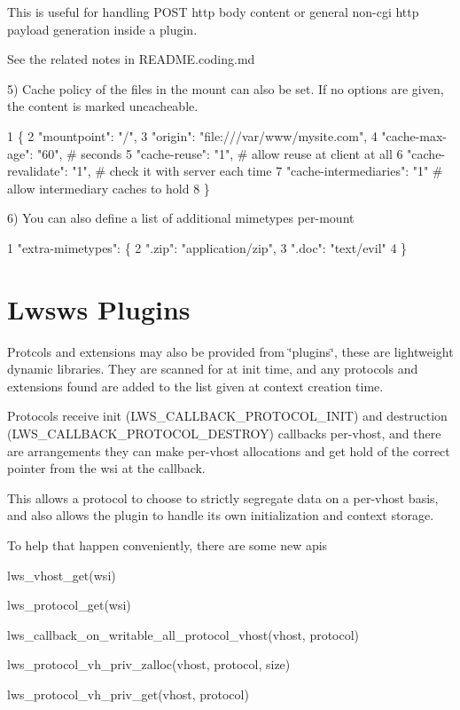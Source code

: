 This is useful for handling P\+O\+ST http body content or general non-\/cgi http payload generation inside a plugin.

See the related notes in R\+E\+A\+D\+M\+E.\+coding.\+md

5) Cache policy of the files in the mount can also be set. If no options are given, the content is marked uncacheable. 
\begin{DoxyCode}
1 \{
2  "mountpoint": "/",
3  "origin": "file:///var/www/mysite.com",
4  "cache-max-age": "60",      # seconds
5  "cache-reuse": "1",         # allow reuse at client at all
6  "cache-revalidate": "1",    # check it with server each time
7  "cache-intermediaries": "1" # allow intermediary caches to hold
8 \}
\end{DoxyCode}


6) You can also define a list of additional mimetypes per-\/mount 
\begin{DoxyCode}
1 "extra-mimetypes": \{
2          ".zip": "application/zip",
3          ".doc": "text/evil"
4  \}
\end{DoxyCode}
\hypertarget{md_README.lwsws_lwswspl}{}\section{Lwsws Plugins}\label{md_README.lwsws_lwswspl}
Protcols and extensions may also be provided from \char`\"{}plugins\char`\"{}, these are lightweight dynamic libraries. They are scanned for at init time, and any protocols and extensions found are added to the list given at context creation time.

Protocols receive init (L\+W\+S\+\_\+\+C\+A\+L\+L\+B\+A\+C\+K\+\_\+\+P\+R\+O\+T\+O\+C\+O\+L\+\_\+\+I\+N\+IT) and destruction (L\+W\+S\+\_\+\+C\+A\+L\+L\+B\+A\+C\+K\+\_\+\+P\+R\+O\+T\+O\+C\+O\+L\+\_\+\+D\+E\+S\+T\+R\+OY) callbacks per-\/vhost, and there are arrangements they can make per-\/vhost allocations and get hold of the correct pointer from the wsi at the callback.

This allows a protocol to choose to strictly segregate data on a per-\/vhost basis, and also allows the plugin to handle its own initialization and context storage.

To help that happen conveniently, there are some new apis


\begin{DoxyItemize}
\item lws\+\_\+vhost\+\_\+get(wsi)
\item lws\+\_\+protocol\+\_\+get(wsi)
\item lws\+\_\+callback\+\_\+on\+\_\+writable\+\_\+all\+\_\+protocol\+\_\+vhost(vhost, protocol)
\item lws\+\_\+protocol\+\_\+vh\+\_\+priv\+\_\+zalloc(vhost, protocol, size)
\item lws\+\_\+protocol\+\_\+vh\+\_\+priv\+\_\+get(vhost, protocol)
\end{DoxyItemize}

